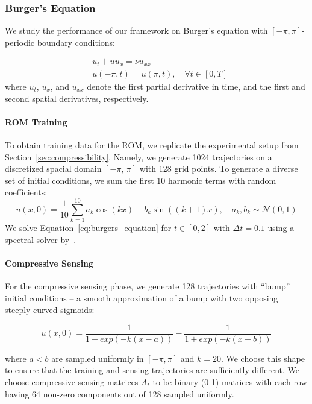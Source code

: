 \subsubsection{Burger's Equation}
We study the performance of our framework on Burger's equation with $[-\pi, \pi]$-periodic boundary conditions:

\begin{equation}
\begin{split}
    & u_t  + uu_x = \nu u_{xx} \\
    & u(-\pi, t) = u(\pi, t),\quad \forall t \in [0, T]
\end{split}
\end{equation}
where $u_t$, $u_x$, and $u_{xx}$ denote the first partial derivative in time, and the first and second spatial derivatives, respectively.

\paragraph{ROM Training} To obtain training data for the ROM, we replicate the experimental setup from Section~\ref{sec:compressibility}. Namely, we generate 1024 trajectories on a discretized spacial domain $[-\pi,\,\pi]$ with 128 grid points. To generate a diverse set of initial conditions, we sum the first 10 harmonic terms with random coefficients:
\begin{equation}
    \label{eq:burger_initial_condition_sine}
    u(x, 0) = \frac{1}{10}\sum_{k = 1}^{10} a_k\cos(kx) + b_k\sin((k+1)x), \quad a_k, b_k \sim \mathcal{N}(0, 1)
\end{equation}
 We solve Equation~\ref{eq:burgers_equation} for $t \in [0, 2]$ with $\Delta t = 0.1$ using a spectral solver by~\cite{trefethen2000spectral}. 

\paragraph{Compressive Sensing}
For the compressive sensing phase, we generate 128 trajectories with ``bump'' initial conditions -- a smooth approximation of a bump with two opposing steeply-curved sigmoids:

\begin{equation}
    \label{eq:burger_initial_condition_bumps}
    u(x, 0) = \frac{1}{1 + exp(-k(x-a))} - \frac{1}{1 + exp(-k(x-b))}
\end{equation}

where $a < b$ are sampled uniformly in $[-\pi, \pi]$ and $k = 20$. We choose this shape to ensure that the training and sensing trajectories are sufficiently different. We choose compressive sensing matrices $A_t$ to be binary (0-1) matrices with each row having 64 non-zero components out of 128 sampled uniformly.

